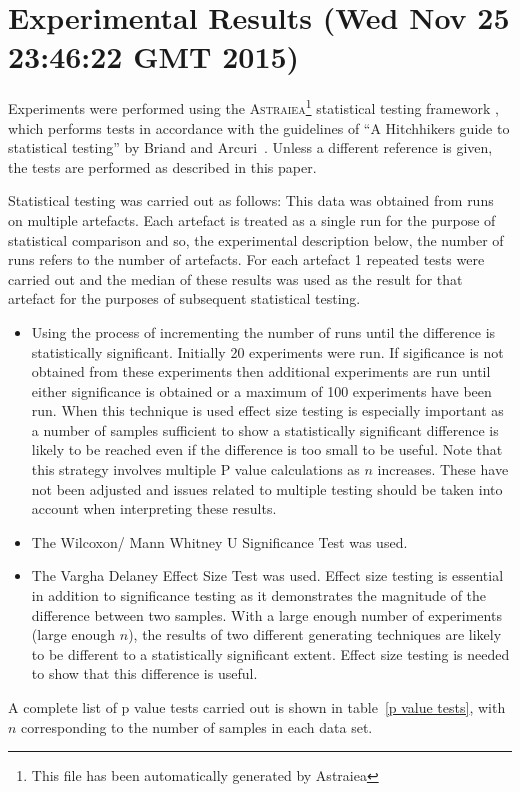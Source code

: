\documentclass[]{article}
\begin{document}
\section{Experimental Results (Wed Nov 25 23:46:22 GMT 2015)}
Experiments were performed using the \textsc{Astraiea}\footnote{This file has been automatically generated by Astraiea} statistical testing framework \cite{Neumann:2014:EET:2598394.2609850},
which performs tests in accordance with the guidelines of ``A Hitchhikers guide to statistical testing''
by Briand and Arcuri~\cite{Arcuri2012}.
Unless a different reference is given, the tests are performed as described in this paper.

Statistical testing was carried out as follows: 
This data was obtained from runs on multiple artefacts. Each artefact is treated as a single run for the purpose of statistical comparison and so, the experimental description below,  the number of runs refers to the number of artefacts. For each artefact 1 repeated tests were carried out and the median of these results was used as the result for that artefact for the purposes of subsequent statistical testing.\begin{itemize}
\item{Using the process of incrementing the number of runs until the difference is statistically significant. Initially 20 experiments were run. If sigificance is not obtained from these experiments then additional experiments are run until either significance is obtained or a maximum of 100 experiments have been run. When this technique is used effect size testing is especially important as a number of samples sufficient to show a statistically significant difference is likely to be reached even if the difference is too small to be useful. Note that this strategy involves multiple P value calculations as $n$ increases. These have not been adjusted and issues related to multiple testing should be taken into account when interpreting these results.
}
\item{The Wilcoxon/ Mann Whitney U Significance Test was used.}
\item{The Vargha Delaney Effect Size Test was used. Effect size testing is essential in addition to significance testing as it demonstrates the magnitude of the difference between two samples. With a large enough number of experiments (large enough $n$), the results of two different generating techniques are likely to be different to a statistically significant extent. Effect size testing is needed to show that this difference is useful.}
\end{itemize}A complete list of p value tests carried out is shown in table~\ref{p value tests}, with $n$ corresponding to the number of samples in each data set.
\end{document}
